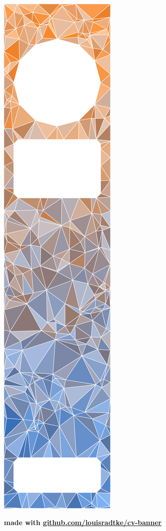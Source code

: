 \documentclass[a4paper,11pt]{article}
\newcommand{\col}[2]{\textcolor[HTML]{#1}{#2}}
\begin{document}
\noindent
\begin{minipage}[t]{0.3106\textwidth}
    \clearpage  %
    \vspace{-0.45cm}
    \includegraphics[width=\textwidth]{triangles.pdf}
    \begin{center}
    \tiny \col{316dbc}{\textbf{made with \href{https://github.com/louisradtke/cv-banner}{github.com/louisradtke/cv-banner}}}
    \end{center}


\end{minipage}
\end{document}
